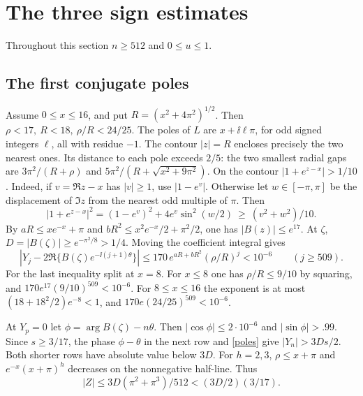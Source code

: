 \section{The three sign estimates}
Throughout this section \(n\ge512\) and \(0\le u\le1\).

\subsection{The first conjugate poles}
Assume \(0\le x\le16\), and put \(R=(x^2+4\pi^2)^{1/2}\). Then \(\rho<17,\ R<18,\ \rho/R<24/25\). The poles of \(L\) are \(x+\ii\ell\pi\), for odd signed integers \(\ell\), all with residue \(-1\). The contour \(|z|=R\) encloses precisely the two nearest ones. Its distance to each pole exceeds \(2/5\): the two smallest radial gaps are \(3\pi^2/(R+\rho)\) and \(5\pi^2/(R+\sqrt{x^2+9\pi^2})\). On the contour \(|1+e^{z-x}|>1/10\). Indeed, if \(v=\Re z-x\) has \(|v|\ge1\), use \(|1-e^v|\). Otherwise let \(w\in[-\pi,\pi]\) be the displacement of \(\Im z\) from the nearest odd multiple of \(\pi\). Then
\[
 |1+e^{z-x}|^2=(1-e^v)^2+4e^v\sin^2(w/2)
 \ \ge\ (v^2+w^2)/10.
\]
By \(aR\le xe^{-x}+\pi\) and \(bR^2\le x^2e^{-x}/2+\pi^2/2\), one has \(|B(z)|\le e^{17}\). At \(\zeta\), \(D=|B(\zeta)|\ge e^{-\pi^2/8}>1/4\). Moving the coefficient integral gives
\begin{equation}\label{poles}
 \left|Y_j-2\Re\{B(\zeta)e^{-\ii(j+1)\theta}\}\right|
 \le170\,e^{aR+bR^2}(\rho/R)^j <10^{-6}\qquad(j\ge509).
\end{equation}
For the last inequality split at \(x=8\). For \(x\le8\) one has \(\rho/R\le9/10\) by squaring, and \(170e^{17}(9/10)^{509}<10^{-6}\). For \(8\le x\le16\) the exponent is at most \((18+18^2/2)e^{-8}<1\), and \(170e(24/25)^{509}<10^{-6}\).

At \(Y_p=0\) let \(\phi=\arg B(\zeta)-n\theta\). Then \(|\cos\phi|\le2\cdot10^{-6}\) and \(|\sin\phi|>.99\). Since \(s\ge3/17\), the phase \(\phi-\theta\) in the next row and \eqref{poles} give \(|Y_n|>3Ds/2\). Both shorter rows have absolute value below \(3D\). For \(h=2,3\), \(\rho\le x+\pi\) and \(e^{-x}(x+\pi)^h\) decreases on the nonnegative half-line. Thus
\[
 |Z|\le 3D(\pi^2+\pi^3)/512 < (3D/2)(3/17).
\]

